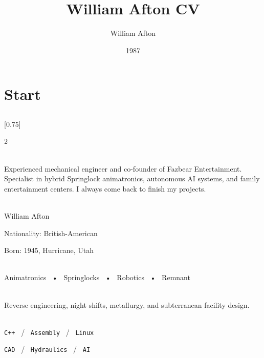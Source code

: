 \documentclass[lighthipster]{simplehipstercv}
\title{William Afton CV}
\author{William Afton}
\date{1987}
\begin{document}
\thispagestyle{empty}

\section*{Start}


\subsection*{}
\vspace{4em}

\setlength{\columnsep}{1.5cm}
[0.75]
\begin{paracol}{2}

\paracolbackgroundoptions

\footnotesize
{\setasidefontcolour
\flushright
\begin{center}
\end{center}

\\[0.5em]

{\footnotesize
Experienced mechanical engineer and co-founder of Fazbear Entertainment. Specialist in hybrid Springlock animatronics, autonomous AI systems, and family entertainment centers. I always come back to finish my projects.}
\bigskip

 \\[0.5em]
William Afton

Nationality: British-American

Born: 1945, Hurricane, Utah

\bigskip

 \\[0.5em]

Animatronics ~•~ Springlocks ~•~ Robotics ~•~ Remnant

\bigskip

\\[0.5em]

Reverse engineering, night shifts, metallurgy, and subterranean facility design.
\bigskip

\\[0.5em]

\texttt{C++} ~/~ \texttt{Assembly} ~/~ \texttt{Linux}

\texttt{CAD} ~/~ \texttt{Hydraulics} ~/~ \texttt{AI}

}
\end{paracol}
\end{document}
